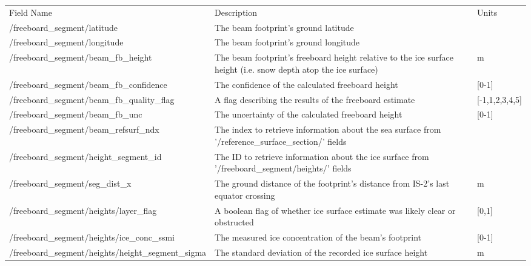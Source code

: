 
\label{appendix:A}
\tiny
  \begin{table}[htbp]
   \begin{adjustwidth}{-4em}{-4em}
   \centering
  \begin{tabularx}{1.33\textwidth} {|X|X|l|}
   \hline
   Field Name & Description & Units\\ 
\hhline{|=|=|=|}
   /freeboard\_segment/latitude & The beam footprint's ground latitude & \\ 
   \hline
   /freeboard\_segment/longitude & The beam footprint's ground longitude & \\ 
   \hline
   /freeboard\_segment/beam\_fb\_height & The beam footprint's freeboard height relative to the ice surface height (i.e. snow depth atop the ice surface) & m \\ 
   \hline
   /freeboard\_segment/beam\_fb\_confidence & The confidence of the calculated freeboard height & [0-1]\\ 
   \hline
   /freeboard\_segment/beam\_fb\_quality\_flag & A flag describing the results of the freeboard estimate & [-1,1,2,3,4,5] \\ 
   \hline
   /freeboard\_segment/beam\_fb\_unc & The uncertainty of the calculated freeboard height & [0-1]\\ 
   \hline
   /freeboard\_segment/beam\_refsurf\_ndx & The index to retrieve information about the sea surface from '/reference\_surface\_section/' fields & \\ 
   \hline
   /freeboard\_segment/height\_segment\_id & The ID to retrieve information about the ice surface from '/freeboard\_segment/heights/' fields & \\ 
   \hline
   /freeboard\_segment/seg\_dist\_x & The ground distance of the footprint's distance from IS-2's last equator crossing & m\\ 
\hhline{|=|=|=|}
   /freeboard\_segment/heights/layer\_flag & A boolean flag of whether ice surface estimate was likely clear or obstructed & [0,1]\\ 
   \hline
   /freeboard\_segment/heights/ice\_conc\_ssmi & The measured ice concentration of the beam's footprint & [0-1] \\ 
   \hline
   /freeboard\_segment/heights/\newline \indent height\_segment\_sigma & The standard deviation of the recorded ice surface height & m\\ 

\end{tabularx}
\end{adjustwidth}
\end{table}
